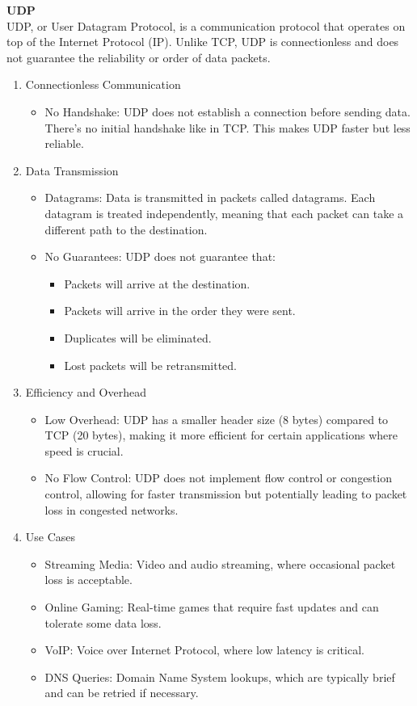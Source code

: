 \documentclass{article}
\begin{document}
\textbf{UDP}\\

UDP, or User Datagram Protocol, is a communication protocol that operates on top of the Internet Protocol (IP). Unlike TCP, UDP is connectionless and does not guarantee the reliability or order of data packets.

\begin{enumerate}[label=\arabic*]
\item Connectionless Communication
	\begin{itemize}
	\item No Handshake: UDP does not establish a connection before sending data. There’s no initial handshake like in TCP. This makes UDP faster but less reliable.
	\end{itemize}
\item Data Transmission
	\begin{itemize}
	\item Datagrams: Data is transmitted in packets called datagrams. Each datagram is treated independently, meaning that each packet can take a different path to the destination.
	\item No Guarantees: UDP does not guarantee that:
		\begin{itemize}
		\item Packets will arrive at the destination.
		\item Packets will arrive in the order they were sent.
		\item Duplicates will be eliminated.
		\item Lost packets will be retransmitted.
		\end{itemize}
	\end{itemize}
\item Efficiency and Overhead
	\begin{itemize}
	\item Low Overhead: UDP has a smaller header size (8 bytes) compared to TCP (20 bytes), making it more efficient for certain applications where speed is crucial.
	\item No Flow Control: UDP does not implement flow control or congestion control, allowing for faster transmission but potentially leading to packet loss in congested networks.
	\end{itemize}
\item Use Cases
	\begin{itemize}
	\item Streaming Media: Video and audio streaming, where occasional packet loss is acceptable.
	\item Online Gaming: Real-time games that require fast updates and can tolerate some data loss.
	\item VoIP: Voice over Internet Protocol, where low latency is critical.
	\item DNS Queries: Domain Name System lookups, which are typically brief and can be retried if necessary.
	\end{itemize}
\end{enumerate}
\end{document}

